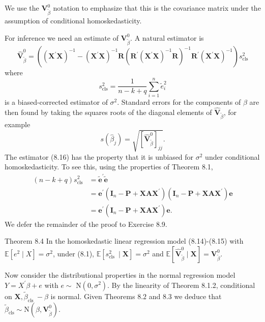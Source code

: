 \documentclass[10pt]{article}
\begin{document}
We use the $\boldsymbol{V}_{\tilde{\beta}}^{0}$ notation to emphasize that this is the covariance matrix under the assumption of conditional homoskedasticity.

For inference we need an estimate of $\boldsymbol{V}_{\widetilde{\beta}}^{0}$. A natural estimator is
$$
\widehat{\boldsymbol{V}}_{\widetilde{\beta}}^{0}=\left(\left(\boldsymbol{X}^{\prime} \boldsymbol{X}\right)^{-1}-\left(\boldsymbol{X}^{\prime} \boldsymbol{X}\right)^{-1} \boldsymbol{R}\left(\boldsymbol{R}^{\prime}\left(\boldsymbol{X}^{\prime} \boldsymbol{X}\right)^{-1} \boldsymbol{R}\right)^{-1} \boldsymbol{R}^{\prime}\left(\boldsymbol{X}^{\prime} \boldsymbol{X}\right)^{-1}\right) s_{\mathrm{cls}}^{2}
$$
where
$$
s_{\mathrm{cls}}^{2}=\frac{1}{n-k+q} \sum_{i=1}^{n} \widetilde{e}_{i}^{2}
$$
is a biased-corrected estimator of $\sigma^{2}$. Standard errors for the components of $\beta$ are then found by taking the squares roots of the diagonal elements of $\widehat{\boldsymbol{V}}_{\widetilde{\beta}}$, for example
$$
s\left(\widehat{\beta}_{j}\right)=\sqrt{\left[\widehat{\boldsymbol{V}}_{\widetilde{\beta}}^{0}\right]_{j j}} .
$$
The estimator (8.16) has the property that it is unbiased for $\sigma^{2}$ under conditional homoskedasticity. To see this, using the properties of Theorem 8.1,
$$
\begin{aligned}
(n-k+q) s_{\mathrm{cls}}^{2} &=\widetilde{\boldsymbol{e}}^{\prime} \widetilde{\boldsymbol{e}} \\
&=\boldsymbol{e}^{\prime}\left(\boldsymbol{I}_{n}-\boldsymbol{P}+\boldsymbol{X} \boldsymbol{A} \boldsymbol{X}^{\prime}\right)\left(\boldsymbol{I}_{n}-\boldsymbol{P}+\boldsymbol{X} \boldsymbol{A} \boldsymbol{X}^{\prime}\right) \boldsymbol{e} \\
&=\boldsymbol{e}^{\prime}\left(\boldsymbol{I}_{n}-\boldsymbol{P}+\boldsymbol{X} \boldsymbol{A} \boldsymbol{X}^{\prime}\right) \boldsymbol{e} .
\end{aligned}
$$
We defer the remainder of the proof to Exercise 8.9.

Theorem 8.4 In the homoskedastic linear regression model (8.14)-(8.15) with $\mathbb{E}\left[e^{2} \mid X\right]=\sigma^{2}$, under (8.1), $\mathbb{E}\left[s_{\text {cls }}^{2} \mid \boldsymbol{X}\right]=\sigma^{2}$ and $\mathbb{E}\left[\widehat{\boldsymbol{V}}_{\widetilde{\beta}}^{0} \mid \boldsymbol{X}\right]=\boldsymbol{V}_{\widetilde{\beta}}^{0} .$

Now consider the distributional properties in the normal regression model $Y=X^{\prime} \beta+e$ with $e \sim$ $\mathrm{N}\left(0, \sigma^{2}\right)$. By the linearity of Theorem 8.1.2, conditional on $\boldsymbol{X}, \widetilde{\beta}_{\text {cls }}-\beta$ is normal. Given Theorems $8.2$ and $8.3$ we deduce that $\widetilde{\beta}_{\mathrm{cls}} \sim \mathrm{N}\left(\beta, \boldsymbol{V}_{\widetilde{\beta}}^{0}\right)$.
\end{document}
